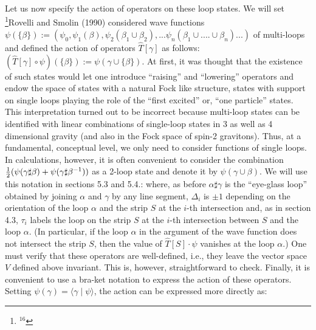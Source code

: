 Let us now specify the action of operators on these loop states. We will
set%
\footnote{$^{16}$}{Rovelli and Smolin (1990) considered wave functions
$\psi(\{\beta\}) := (\psi_0 , \psi_1(\beta), \psi_2(\beta_1\cup\beta_2),
...\psi_n(\beta_1\cup ....\cup\beta_n ) ... )$ of multi-loops and defined
the action of operators $\hat{T}[\gamma]$ as follows: $(\hat{T}[\gamma ]
\circ\psi) (\{\beta\}) := \psi (\gamma\cup\{\beta\})$. At first, it was
thought that the existence of such states would let one introduce
``raising'' and ``lowering'' operators and
endow the space of states with a natural Fock like structure, states with
support on single loops playing the role of the ``first excited'' or,
``one particle'' states. This interpretation turned out to be incorrect
because multi-loop states can be identified with linear combinations of
single-loop states in 3 as well as 4 dimensional gravity (and also in the
Fock space of spin-2 gravitons). Thus, at a fundamental, conceptual level,
we only need to consider functions of single loops. In calculations, however,
it is often convenient to consider the combination $\textstyle{1\over 2}(\psi
(\gamma\sharp\beta)+ \psi (\gamma\sharp\beta^{-1}))$ as a 2-loop state and
denote it by $\psi (\gamma\cup\beta )$. We will use this notation in sections
5.3 and 5.4.}:
where, as before $\alpha\sharp\gamma$ is the ``eye-glass loop'' obtained
by joining $\alpha$ and $\gamma$ by any line segment,
$\Delta_i$ is $\pm 1$ depending on the orientation of the loop
$\alpha$ and the strip $S$ at the $i$-th intersection and, as in section
4.3, $\tau_i$ labels the loop on the strip $S$ at the $i$-th intersection
between $S$ and the loop $\alpha$. (In particular, if the loop $\alpha$
in the argument of the wave function does not intersect the strip $S$,
then the value of $\hat{T}[S]\cdot \psi$ vanishes at the loop $\alpha$.)
One must verify that these operators are well-defined, i.e., they leave
the vector space $V$ defined above invariant. This is, however,
straightforward to check. Finally, it is convenient to use a bra-ket notation
to express the action of these operators. Setting $\psi(\gamma ) =\langle
\gamma\mid \psi \rangle$, the action can be expressed more directly as:
